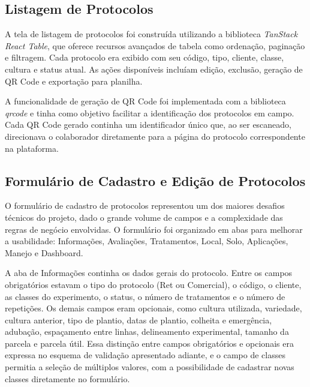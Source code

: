 \subsection{Listagem de Protocolos}

A tela de listagem de protocolos foi construída utilizando a biblioteca \textit{TanStack React Table}, que oferece recursos avançados de tabela como ordenação, paginação e filtragem. Cada protocolo era exibido com seu código, tipo, cliente, classe, cultura e status atual. As ações disponíveis incluíam edição, exclusão, geração de QR Code e exportação para planilha.

A funcionalidade de geração de QR Code foi implementada com a biblioteca \textit{qrcode} e tinha como objetivo facilitar a identificação dos protocolos em campo. Cada QR Code gerado continha um identificador único que, ao ser escaneado, direcionava o colaborador diretamente para a página do protocolo correspondente na plataforma.

\subsection{Formulário de Cadastro e Edição de Protocolos}

O formulário de cadastro de protocolos representou um dos maiores desafios técnicos do projeto, dado o grande volume de campos e a complexidade das regras de negócio envolvidas. O formulário foi organizado em abas para melhorar a usabilidade: Informações, Avaliações, Tratamentos, Local, Solo, Aplicações, Manejo e Dashboard.

A aba de Informações continha os dados gerais do protocolo. Entre os campos obrigatórios estavam o tipo do protocolo (Ret ou Comercial), o código, o cliente, as classes do experimento, o status, o número de tratamentos e o número de repetições. Os demais campos eram opcionais, como cultura utilizada, variedade, cultura anterior, tipo de plantio, datas de plantio, colheita e emergência, adubação, espaçamento entre linhas, delineamento experimental, tamanho da parcela e parcela útil. Essa distinção entre campos obrigatórios e opcionais era expressa no esquema de validação apresentado adiante, e o campo de classes permitia a seleção de múltiplos valores, com a possibilidade de cadastrar novas classes diretamente no formulário. 

